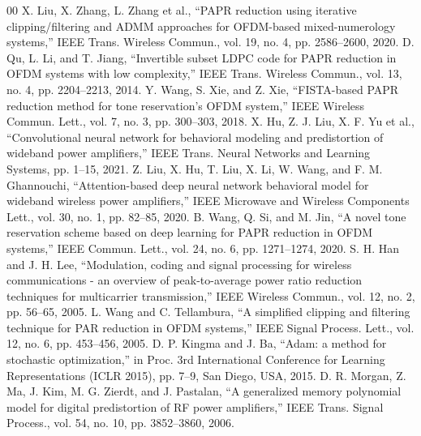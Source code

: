 \documentclass[journal]{IEEEtran}
\begin{document}
\begin{thebibliography}{00}
 X. Liu, X. Zhang, L. Zhang et al., “PAPR reduction using iterative clipping/filtering and ADMM approaches for OFDM-based mixed-numerology systems,” IEEE Trans. Wireless Commun., vol. 19, no. 4, pp. 2586–2600, 2020.
 D. Qu, L. Li, and T. Jiang, “Invertible subset LDPC code for PAPR reduction in OFDM systems with low complexity,” IEEE Trans. Wireless Commun., vol. 13, no. 4, pp. 2204–2213, 2014.
 Y. Wang, S. Xie, and Z. Xie, “FISTA-based PAPR reduction method for tone reservation's OFDM system,” IEEE Wireless Commun. Lett., vol. 7, no. 3, pp. 300–303, 2018.
 X. Hu, Z. J. Liu, X. F. Yu et al., “Convolutional neural network for behavioral modeling and predistortion of wideband power amplifiers,” IEEE Trans. Neural Networks and Learning Systems, pp. 1–15, 2021.
 Z. Liu, X. Hu, T. Liu, X. Li, W. Wang, and F. M. Ghannouchi, “Attention-based deep neural network behavioral model for wideband wireless power amplifiers,” IEEE Microwave and Wireless Components Lett., vol. 30, no. 1, pp. 82–85, 2020.
 B. Wang, Q. Si, and M. Jin, “A novel tone reservation scheme based on deep learning for PAPR reduction in OFDM systems,” IEEE Commun. Lett., vol. 24, no. 6, pp. 1271–1274, 2020.
 S. H. Han and J. H. Lee, “Modulation, coding and signal processing for wireless communications - an overview of peak-to-average power ratio reduction techniques for multicarrier transmission,” IEEE Wireless Commun., vol. 12, no. 2, pp. 56–65, 2005.
 L. Wang and C. Tellambura, “A simplified clipping and filtering technique for PAR reduction in OFDM systems,” IEEE Signal Process. Lett., vol. 12, no. 6, pp. 453–456, 2005.
 D. P. Kingma and J. Ba, “Adam: a method for stochastic optimization,” in Proc. 3rd International Conference for Learning Representations (ICLR 2015), pp. 7–9, San Diego, USA, 2015.
 D. R. Morgan, Z. Ma, J. Kim, M. G. Zierdt, and J. Pastalan, “A generalized memory polynomial model for digital predistortion of RF power amplifiers,” IEEE Trans. Signal Process., vol. 54, no. 10, pp. 3852–3860, 2006.
\end{thebibliography}
\end{document}
